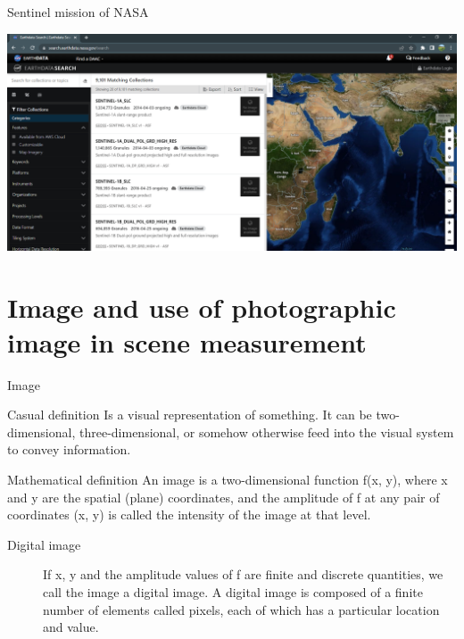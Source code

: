 \documentclass[10pt,dvipsnames,ignorenonframetext,aspectratio=169]{beamer}
\begin{document}
\begin{frame}{Sentinel mission of NASA}
\protect\hypertarget{sentinel-mission-of-nasa}{}
\begin{center}\includegraphics[width=0.85\linewidth]{../images/earthdata_nasa_sentinel_data_viewer} \end{center}
\end{frame}

\hypertarget{image-and-use-of-photographic-image-in-scene-measurement}{%
\section{Image and use of photographic image in scene
measurement}\label{image-and-use-of-photographic-image-in-scene-measurement}}

\begin{frame}{Image}
\protect\hypertarget{image}{}
\begin{block}{Casual definition}
Is a visual representation of something. It can be two-dimensional, three-dimensional, or somehow otherwise feed into the visual system to convey information.
\end{block}

\begin{block}{Mathematical definition}
An image is a two-dimensional function f(x, y), where x and y are the spatial (plane) coordinates, and the amplitude of f at any pair of coordinates (x, y) is called the intensity of the image at that level.
\end{block}

\begin{description}
\item[Digital image] If x, y and the amplitude values of f are finite and discrete quantities, we call the image a digital image. A digital image is composed of a finite number of elements called pixels, each of which has a particular location and value.
\end{description}
\end{frame}
\end{document}
